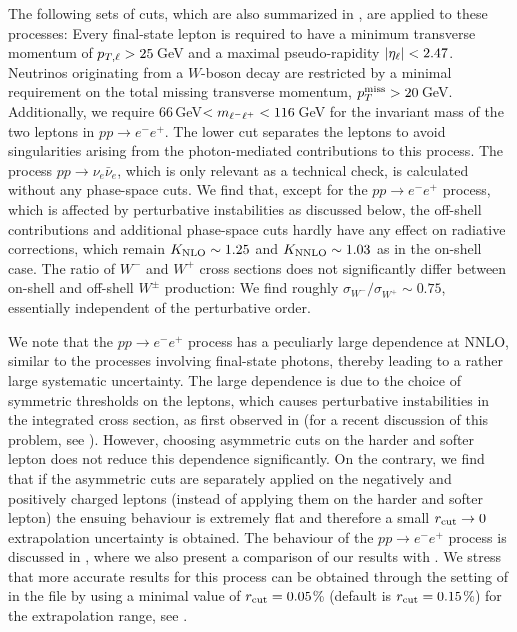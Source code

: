 \documentclass[english,11pt]{article}
\begin{document}
%

%
The following sets of cuts, which are also summarized in , are applied to these processes: 
Every final-state lepton is required to have a minimum transverse momentum of $p_{T,{\ell}}{} > 25$\,GeV and a maximal pseudo-rapidity $|\eta_{\ell}|{} < 2.47$. Neutrinos originating 
from a $W$-boson decay are restricted by a minimal requirement on the total missing transverse momentum, $p_{T}^{\text{miss}} > 20$\,GeV.
Additionally, we require $66$\,GeV$<m_{\ell^-\ell^+}<116$\,GeV for the invariant mass of the two leptons in $pp\to e^-e^+$.
The lower cut separates the leptons to avoid singularities arising from the photon-mediated contributions to this process.
The process $pp\to \nu_e\bar\nu_e$, which is only relevant as a technical check, is calculated
without any phase-space cuts.
We find that, except for the $pp\to e^-e^+$ process, which is affected by perturbative 
instabilities as discussed below, 
the off-shell contributions and additional phase-space cuts hardly have 
any effect on radiative corrections, which remain $K_{\rm NLO}\sim 1.25$
and  $K_{\rm NNLO}\sim 1.03$ as in the on-shell case. 
The ratio of $W^-$ and $W^+$ cross sections does not significantly differ
between on-shell and 
off-shell $W^\pm$ production: We find roughly $\sigma_{W^-}/\sigma_{W^+}\sim 0.75$, essentially independent of the perturbative order.

We note that the $pp\to e^-e^+$ process has a peculiarly large \rcut{} dependence at NNLO, 
similar to the processes involving final-state photons, thereby leading to a rather large systematic uncertainty.
The large \rcut{} dependence is due to the choice of symmetric \pt{} thresholds on the 
leptons,
which causes perturbative instabilities in the integrated cross section,
as first observed in  (for a recent discussion of this problem, see ).
However, choosing asymmetric \pt{} cuts on the harder and softer lepton does not 
reduce this dependence significantly. On the contrary,
we find that if the asymmetric cuts are separately applied on the negatively and positively charged leptons
(instead of applying them on the harder and softer lepton)
the ensuing \rcut{} behaviour is extremely flat and therefore a small 
$r_{\mathrm{cut}}\rightarrow 0$ extrapolation uncertainty is obtained.
The \rcut{} behaviour of the $pp\to e^-e^+$ process is 
discussed in , where we also present a comparison of our results with \FEWZ{}. 
We stress that more accurate results for this process can be obtained through the setting of  in the file  by using 
a minimal value of $r_{\mathrm{cut}}=0.05$\% (default is $r_{\mathrm{cut}}=0.15$\%) for the extrapolation range,
see .
\end{document}
